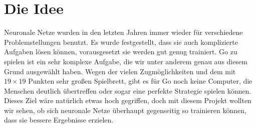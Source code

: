 \section{Die Idee}
Neuronale Netze wurden in den letzten Jahren immer wieder für verschiedene
Problemstellungen benutzt. Es wurde festgestellt, dass sie auch komplizierte
Aufgaben lösen können, vorausgesetzt sie werden gut genug trainiert. Go zu
spielen ist ein sehr komplexe Aufgabe, die wir unter anderem genau aus diesem
Grund ausgewählt haben. Wegen der vielen Zugmöglichkeiten und dem mit $19
{\times} 19$ Punkten sehr großen Spielbrett, gibt es für Go noch keine
Computer, die Menschen deutlich übertreffen oder sogar eine perfekte Strategie
spielen können. Dieses Ziel wäre natürlich etwas hoch gegriffen, doch mit
diesem Projekt wollten wir sehen, ob sich neuronale Netze überhaupt gegenseitig
so trainieren können, dass sie bessere Ergebnisse erzielen.
